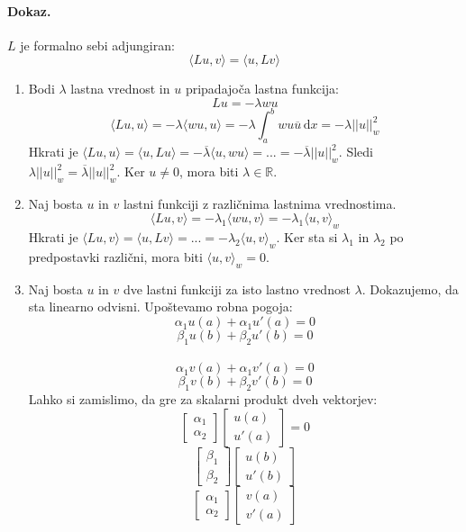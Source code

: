 \documentclass[a4paper]{article}
\newcommand{\dif}{\,\mathrm{d}}
\newcommand{\R}{\mathbb{R}}
\newcommand{\avg}[1]{\langle {#1} \rangle}
\begin{document}
\paragraph{Dokaz.} $L$ je formalno sebi adjungiran:
$$\avg{Lu, v} = \avg{u, Lv}$$
\begin{enumerate}
    \item Bodi $\lambda$ lastna vrednost in $u$ pripadajoča lastna funkcija:
    $$Lu = -\lambda wu$$
    $$\avg{Lu, u} = -\lambda \avg{wu, u} = -\lambda \int_{a}^{b}wu\overline{u}\dif x = -\lambda ||u||^2_w$$
    Hkrati je $\avg{Lu, u} = \avg{u, Lu} = -\overline{\lambda} \avg{u, wu} = ... = -\overline{\lambda} ||u||^2_w$. Sledi $\lambda||u||_w^2 = \overline{\lambda}||u||_w^2$. Ker $u\neq0$, mora biti $\lambda \in \R$.
    \item Naj bosta $u$ in $v$ lastni funkciji z različnima lastnima vrednostima. $$\avg{Lu, v} = -\lambda_1\avg{wu, v} = -\lambda_1\avg{u,v}_w$$
    Hkrati je $\avg{Lu, v} = \avg{u, Lv} = ... = -\lambda_2\avg{u, v}_w$. Ker sta si $\lambda_1$ in $\lambda_2$ po predpostavki različni, mora biti $\avg{u, v}_w = 0$.
    \item Naj bosta $u$ in $v$ dve lastni funkciji za isto lastno vrednost $\lambda$. Dokazujemo, da sta linearno odvisni.
    Upoštevamo robna pogoja:
    $$\alpha_1u(a) + \alpha_1u'(a) = 0$$
    $$\beta_1 u(b) + \beta_2 u'(b) = 0$$
    \\
    $$\alpha_1v(a) + \alpha_1v'(a) = 0$$
    $$\beta_1 v(b) + \beta_2 v'(b) = 0$$
    Lahko si zamislimo, da gre za skalarni produkt dveh vektorjev:
    $$\begin{bmatrix}
        \alpha_1 \\ \alpha_2
    \end{bmatrix}\begin{bmatrix}
        u(a) \\ u'(a)
    \end{bmatrix} = 0$$
    $$\begin{bmatrix}
        \beta_1 \\ \beta_2
    \end{bmatrix}\begin{bmatrix}
        u(b) \\ u'(b)
    \end{bmatrix}$$$$\begin{bmatrix}
        \alpha_1 \\ \alpha_2
    \end{bmatrix}\begin{bmatrix}
        v(a) \\ v'(a)

\end{bmatrix}$$
\end{enumerate}
\end{document}
